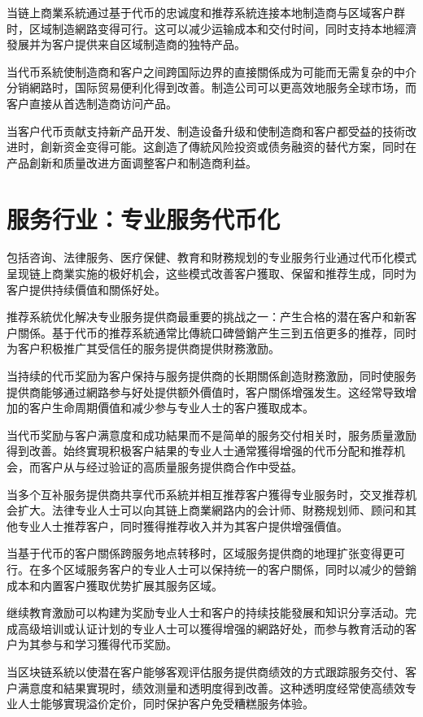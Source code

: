 \documentclass[
  Letterpaper,
]{scrbook}
\begin{document}
当链上商業系統通过基于代币的忠诚度和推荐系統连接本地制造商与区域客户群时，区域制造網路变得可行。这可以减少运输成本和交付时间，同时支持本地經濟發展并为客户提供来自区域制造商的独特产品。

当代币系統使制造商和客户之间跨国际边界的直接關係成为可能而无需复杂的中介分销網路时，国际贸易便利化得到改善。制造公司可以更高效地服务全球市场，而客户直接从首选制造商访问产品。

当客户代币贡献支持新产品开发、制造设备升级和使制造商和客户都受益的技術改进时，創新资金变得可能。这創造了傳統风险投资或债务融资的替代方案，同时在产品創新和质量改进方面调整客户和制造商利益。

\section{服务行业：专业服务代币化}\label{ux670dux52a1ux884cux4e1aux4e13ux4e1aux670dux52a1ux4ee3ux5e01ux5316}

包括咨询、法律服务、医疗保健、教育和財務规划的专业服务行业通过代币化模式呈现链上商業实施的极好机会，这些模式改善客户獲取、保留和推荐生成，同时为客户提供持续價值和關係好处。

推荐系統优化解决专业服务提供商最重要的挑战之一：产生合格的潜在客户和新客户關係。基于代币的推荐系統通常比傳統口碑營銷产生三到五倍更多的推荐，同时为客户积极推广其受信任的服务提供商提供財務激励。

当持续的代币奖励为客户保持与服务提供商的长期關係創造財務激励，同时使服务提供商能够通过網路参与好处提供额外價值时，客户關係增强发生。这经常导致增加的客户生命周期價值和减少参与专业人士的客户獲取成本。

当代币奖励与客户满意度和成功結果而不是简单的服务交付相关时，服务质量激励得到改善。始终實現积极客户結果的专业人士通常獲得增强的代币分配和推荐机会，而客户从与经过验证的高质量服务提供商合作中受益。

当多个互补服务提供商共享代币系統并相互推荐客户獲得专业服务时，交叉推荐机会扩大。法律专业人士可以向其链上商業網路内的会计师、財務规划师、顾问和其他专业人士推荐客户，同时獲得推荐收入并为其客户提供增强價值。

当基于代币的客户關係跨服务地点转移时，区域服务提供商的地理扩张变得更可行。在多个区域服务客户的专业人士可以保持统一的客户關係，同时以减少的營銷成本和内置客户獲取优势扩展其服务区域。

继续教育激励可以构建为奖励专业人士和客户的持续技能發展和知识分享活动。完成高级培训或认证计划的专业人士可以獲得增强的網路好处，而参与教育活动的客户为其参与和学习獲得代币奖励。

当区块链系統以使潜在客户能够客观评估服务提供商绩效的方式跟踪服务交付、客户满意度和結果實現时，绩效测量和透明度得到改善。这种透明度经常使高绩效专业人士能够實現溢价定价，同时保护客户免受糟糕服务体验。
\end{document}
